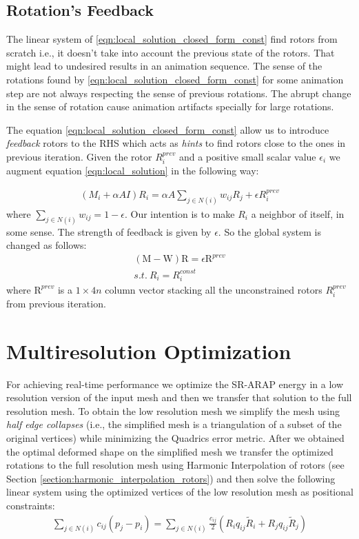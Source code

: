 \documentclass{birkjour}
\numberwithin{equation}{section}
\begin{document}
 \subsection{Rotation's Feedback}
 
The linear system of \ref{eqn:local_solution_closed_form_const} find rotors from scratch i.e., it doesn't take into account the previous state of the rotors. That might lead to undesired results in an animation sequence. The sense of the rotations found by \ref{eqn:local_solution_closed_form_const} for some animation step are not always respecting the sense of previous rotations. The abrupt change in the sense of rotation cause animation artifacts specially for large rotations.

The equation \ref{eqn:local_solution_closed_form_const} allow us to introduce \emph{feedback} rotors to the RHS which acts as \emph{hints} to find rotors close to the ones in previous iteration. Given the rotor $R^{prev}_i$ and a positive small scalar value $\epsilon_i$ we augment equation \ref{eqn:local_solution} in the following way:

\begin{eqnarray}
	\label{eqn:local_solution_feedback}
	(M_i + \alpha A I)R_i  = \alpha A \sum_{j \in N(i)} {w_{ij} R_j} + \epsilon R^{prev}_i
\end{eqnarray}
where  $\sum_{j \in N(i)} {w_{ij}} = 1-\epsilon$. Our intention is to make $R_i$ a neighbor of itself, in some sense. The strength of feedback is given by $\epsilon$. So the global system is changed as follows: 
\begin{eqnarray}	\label{eqn:local_solution_closed_form_const_feedback}
	(\mathrm M - \mathrm W) \mathrm R = \epsilon \mathrm R^{prev}\\
	s.t. \ R_i = R^{const}_i \nonumber
\end{eqnarray}
where $\mathrm R^{prev}$ is a $1\times4n$ column vector stacking all the unconstrained rotors $R^{prev}_i$ from previous iteration.

\section{Multiresolution Optimization}

For achieving real-time performance we optimize the SR-ARAP energy in a low resolution version of the input mesh and then we transfer that solution to the full resolution mesh. To obtain the low resolution mesh we simplify the mesh using \emph{half edge collapses} (i.e., the simplified mesh is a triangulation of a subset of the original vertices) while minimizing the Quadrics error metric.
After we obtained the optimal deformed shape on the simplified mesh we transfer the optimized rotations to the full resolution mesh using Harmonic Interpolation of rotors (see Section \ref{section:harmonic_interpolation_rotors}) and then solve the following linear system using the optimized vertices of the low resolution mesh as positional constraints:
\begin{eqnarray*}
\sum_{j \in N(i)} { c_{ij} (p_j - p_i) } = \sum_{j \in N(i)} { \frac{c_{ij}}{2} (R_i q_{ij} \tilde  R_i + R_j q_{ij} \tilde R_j) }
\end{eqnarray*}
\end{document}
